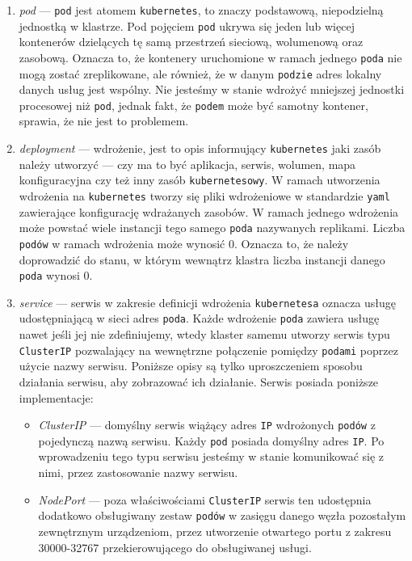 \documentclass[12pt,twoside]{article}
\begin{document}
\begin{enumerate}[label=\arabic*), leftmargin=1.25cm]
\item \textit{pod} — \texttt{pod} jest atomem \texttt{kubernetes}, to znaczy podstawową, niepodzielną jednostką w klastrze. Pod pojęciem \texttt{pod} ukrywa się jeden lub więcej kontenerów dzielących tę samą przestrzeń sieciową, wolumenową oraz zasobową. Oznacza to, że kontenery uruchomione w ramach jednego \texttt{poda} nie mogą zostać zreplikowane, ale również, że w danym \texttt{podzie} adres lokalny danych usług jest wspólny. Nie jesteśmy w stanie wdrożyć mniejszej jednostki procesowej niż \texttt{pod}, jednak fakt, że \texttt{podem} może być samotny kontener, sprawia, że nie jest to problemem.
\item \textit{deployment} — wdrożenie, jest to opis informujący \texttt{kubernetes} jaki zasób należy utworzyć — czy ma to być aplikacja, serwis, wolumen, mapa konfiguracyjna czy też inny zasób \texttt{kubernetesowy}. W ramach utworzenia wdrożenia na \texttt{kubernetes} tworzy się pliki wdrożeniowe w standardzie \texttt{yaml} zawierające konfigurację wdrażanych zasobów. W ramach jednego wdrożenia może powstać wiele instancji tego samego \texttt{poda} nazywanych replikami. Liczba \texttt{podów} w ramach wdrożenia może wynosić 0. Oznacza to, że należy doprowadzić do stanu, w którym wewnątrz klastra liczba instancji danego \texttt{poda} wynosi 0.
\item \textit{service} — serwis w zakresie definicji wdrożenia \texttt{kubernetesa} oznacza usługę udostępniającą w sieci adres \texttt{poda}. Każde wdrożenie \texttt{poda} zawiera usługę nawet jeśli jej nie zdefiniujemy, wtedy klaster samemu utworzy serwis typu \texttt{ClusterIP} pozwalający na wewnętrzne połączenie pomiędzy \texttt{podami} poprzez użycie nazwy serwisu. Poniższe opisy są tylko uproszczeniem sposobu działania serwisu, aby zobrazować ich działanie. Serwis posiada poniższe implementacje\cite{services}:
\begin{itemize}[label=-,labelsep=0.4cm,leftmargin=0.6cm]
\item \textit{ClusterIP} — domyślny serwis wiążący adres \texttt{IP} wdrożonych \texttt{podów} z pojedynczą nazwą serwisu. Każdy \texttt{pod} posiada domyślny adres \texttt{IP}. Po wprowadzeniu tego typu serwisu jesteśmy w stanie komunikować się z nimi, przez zastosowanie nazwy serwisu.
\item \textit{NodePort} — poza właściwościami \texttt{ClusterIP} serwis ten udostępnia dodatkowo obsługiwany zestaw \texttt{podów} w zasięgu danego węzła pozostałym zewnętrznym urządzeniom, przez utworzenie otwartego portu z zakresu 30000-32767 przekierowującego do obsługiwanej usługi.

\end{itemize}
\end{enumerate}
\end{document}
